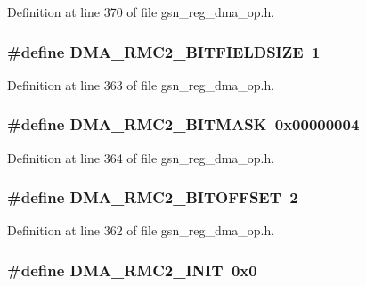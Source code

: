 Definition at line 370 of file gsn\_\-reg\_\-dma\_\-op.h.

\hypertarget{a00547_a084db9480bac43cebae8198fff82ad17}{
\subsubsection[{DMA\_\-RMC2\_\-BITFIELDSIZE}]{\setlength{\rightskip}{0pt plus 5cm}\#define DMA\_\-RMC2\_\-BITFIELDSIZE~1}}
\label{a00547_a084db9480bac43cebae8198fff82ad17}


Definition at line 363 of file gsn\_\-reg\_\-dma\_\-op.h.

\hypertarget{a00547_a7489009b1a8178a381e272ceec884efa}{
\subsubsection[{DMA\_\-RMC2\_\-BITMASK}]{\setlength{\rightskip}{0pt plus 5cm}\#define DMA\_\-RMC2\_\-BITMASK~0x00000004}}
\label{a00547_a7489009b1a8178a381e272ceec884efa}


Definition at line 364 of file gsn\_\-reg\_\-dma\_\-op.h.

\hypertarget{a00547_a9024fc0ebbf15bf06caf6eed604362ac}{
\subsubsection[{DMA\_\-RMC2\_\-BITOFFSET}]{\setlength{\rightskip}{0pt plus 5cm}\#define DMA\_\-RMC2\_\-BITOFFSET~2}}
\label{a00547_a9024fc0ebbf15bf06caf6eed604362ac}


Definition at line 362 of file gsn\_\-reg\_\-dma\_\-op.h.

\hypertarget{a00547_af43b6b91df8724bea9bb011a2097680b}{
\subsubsection[{DMA\_\-RMC2\_\-INIT}]{\setlength{\rightskip}{0pt plus 5cm}\#define DMA\_\-RMC2\_\-INIT~0x0}}
\label{a00547_af43b6b91df8724bea9bb011a2097680b}


